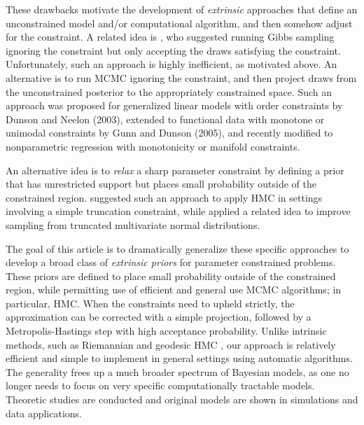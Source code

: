 \documentclass[10pt]{article}
\DeclareMathOperator{\1}{\mathbbm{1}}
\begin{document}
These drawbacks motivate the development of {\em extrinsic} approaches that define an unconstrained model and/or computational algorithm, and then somehow adjust for the constraint. A related idea is \cite{gelfand1992bayesian}, who suggested running Gibbs sampling ignoring the constraint but only accepting the draws satisfying the constraint. Unfortunately, such an approach is highly inefficient, as motivated above. An alternative is to run MCMC ignoring the constraint, and then project draws from the unconstrained posterior to the appropriately constrained space. Such an approach was proposed for generalized linear models with order constraints by Dunson and Neelon (2003), extended to functional data with monotone or unimodal constraints by Gunn and Dunson (2005), and recently modified to nonparametric regression with monotonicity \cite{lin2014monogp} or manifold \cite{lin2016extrinsic} constraints.

An alternative idea is to {\em relax} a sharp parameter constraint by defining a prior that has unrestricted support but places small probability outside of the constrained region. \cite{neal2011mcmc} suggested such an approach to apply HMC in settings involving a simple truncation constraint, while \cite{pakman2014exact} applied a related idea to improve sampling from truncated multivariate normal distributions.

The goal of this article is to dramatically generalize these specific approaches to develop a broad class of {\em extrinsic priors} for parameter constrained problems. These priors are defined to place small probability outside of the constrained region, while permitting use of efficient and general use MCMC algorithms; in particular, HMC. When the constraints need to upheld strictly, the approximation can be corrected with a simple projection, followed by a Metropolis-Hastings step with high acceptance probability.
Unlike intrinsic methods, such as Riemannian and geodesic HMC \citep{girolami2011riemann,byrne2013geodesic}, our approach is
relatively efficient and simple to implement in general settings using automatic algorithms. The generality frees up a much broader spectrum of Bayesian models, as one no longer needs to focus on very specific computationally tractable models.
Theoretic studies are conducted and original models are shown in simulations and data applications.
\end{document}
